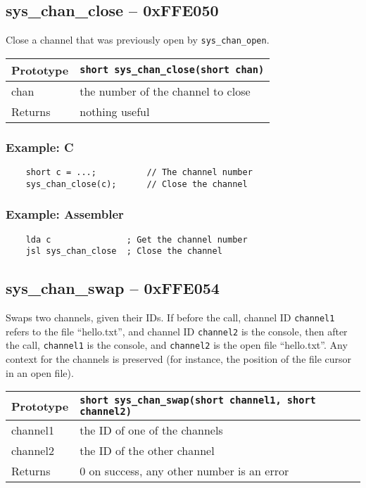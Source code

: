 \subsection*{sys\_chan\_close -- 0xFFE050}
Close a channel that was previously open by \lstinline|sys_chan_open|.

\bigskip

\begin{tabular}{|l||l|} \hline
Prototype & \lstinline!short sys_chan_close(short chan)! \\ \hline
chan & the number of the channel to close \\ \hline
Returns & nothing useful \\ \hline
\end{tabular}

\subsubsection*{Example: C}
\begin{lstlisting}
    short c = ...;          // The channel number
    sys_chan_close(c);      // Close the channel
\end{lstlisting}

\subsubsection*{Example: Assembler}
\begin{verbatim}
    lda c               ; Get the channel number
    jsl sys_chan_close  ; Close the channel
\end{verbatim}

\subsection*{sys\_chan\_swap -- 0xFFE054}
Swaps two channels, given their IDs. If before the call, channel ID \verb+channel1+ refers to the file ``hello.txt'',
and channel ID \verb+channel2+ is the console, then after the call, \verb+channel1+ is the console, and \verb+channel2+ is
the open file ``hello.txt''. Any context for the channels is preserved (for instance, the position of the file cursor in an open file).

\bigskip

\begin{tabular}{|l||l|} \hline
Prototype & \lstinline!short sys_chan_swap(short channel1, short channel2)! \\ \hline
channel1 & the ID of one of the channels \\ \hline
channel2 & the ID of the other channel \\ \hline
Returns & 0 on success, any other number is an error \\ \hline
\end{tabular}

